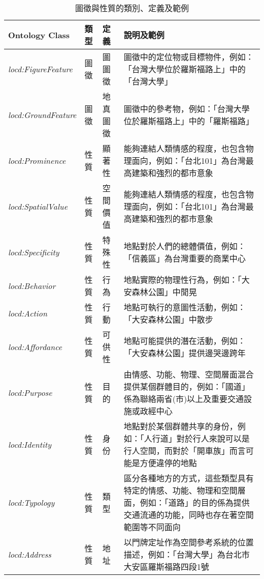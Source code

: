 \begin{table}[htbp]
\centering
\caption{圖徵與性質的類別、定義及範例}
\label{tab:quality}
\begin{adjustbox}{max width=\textwidth}
\renewcommand{\arraystretch}{1.4}
\begin{tabular}{>{\centering\arraybackslash}m{3.5cm} >{\centering\arraybackslash}m{1.5cm} >{\centering\arraybackslash}m{2cm} >{\centering\arraybackslash}m{10cm}}
\toprule
Ontology Class & 類型 & 定義 & 說明及範例 \\
\toprule
\textit{locd:FigureFeature} & 圖徵 & 圖圖徵 & 圖徵中的定位物或目標物件，例如：「台灣大學位於羅斯福路上」中的「台灣大學」 \\
\hline
\textit{locd:GroundFeature} & 圖徵 & 地真圖徵 & 圖徵中的參考物，例如：「台灣大學位於羅斯福路上」中的「羅斯福路」 \\
\hline
\textit{locd:Prominence} & 性質 & 顯著性 & 能夠連結人類情感的程度，也包含物理面向，例如：「台北101」為台灣最高建築和強烈的都市意象 \\
\hline
\textit{locd:SpatialValue} & 性質 & 空間價值 & 能夠連結人類情感的程度，也包含物理面向，例如：「台北101」為台灣最高建築和強烈的都市意象 \\
\hline
\textit{locd:Specificity} & 性質 & 特殊性 & 地點對於人們的總體價值，例如：「信義區」為台灣重要的商業中心 \\
\hline
\textit{locd:Behavior} & 性質 & 行為 & 地點實際的物理性行為，例如：「大安森林公園」中閒晃 \\
\hline
\textit{locd:Action} & 性質 & 行動 & 地點可執行的意圖性活動，例如：「大安森林公園」中散步 \\
\hline
\textit{locd:Affordance} & 性質 & 可供性 & 地點可能提供的潛在活動，例如：「大安森林公園」提供邊哭邊跨年 \\
\hline
\textit{locd:Purpose} & 性質 & 目的 & 由情感、功能、物理、空間層面混合提供某個群體目的，例如：「國道」係為聯絡兩省(市)以上及重要交通設施或政經中心 \\
\hline
\textit{locd:Identity} & 性質 & 身份 & 地點對於某個群體共享的身份，例如：「人行道」對於行人來說可以是行人空間，而對於「開車族」而言可能是方便違停的地點 \\
\hline
\textit{locd:Typology} & 性質 & 類型 & 區分各種地方的方式，這些類型具有特定的情感、功能、物理和空間層面，例如：「道路」的目的係為提供交通流通的功能，同時也存在著空間範圍等不同面向 \\
\hline
\textit{locd:Address} & 性質 & 地址 & 以門牌定址作為空間參考系統的位置描述，例如：「台灣大學」為台北市大安區羅斯福路四段1號 \\

\end{tabular}
\end{adjustbox}
\end{table}
